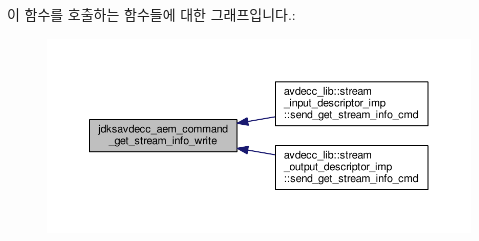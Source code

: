 이 함수를 호출하는 함수들에 대한 그래프입니다.\+:
\nopagebreak
\begin{figure}[H]
\begin{center}
\leavevmode
\includegraphics[width=350pt]{group__command__get__stream__info_gadc285f26ae5f9e8931b21e4712684f1a_icgraph}
\end{center}
\end{figure}


